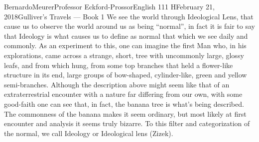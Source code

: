 \documentclass[12pt,letterpaper]{article}
\begin{document}
\begin{mla}{Bernardo}{Meurer}{Professor Eckford-Prossor}{English 111 H}{February 21, 2018}{Gulliver's Travels --- Book 1}
    We see the world through Ideological Lens, that cause us to observe the world around us as being ``normal'', in fact it is fair to say that Ideology is what causes us to define as normal that which we see daily and commonly. As an experiment to this, one can imagine the first Man who, in his explorations, came across a strange, short, tree with uncommonly large, glossy leafs, and from which hung, from some top branches that held a flower-like structure in its end, large groups of bow-shaped, cylinder-like, green and yellow semi-branches. Although the description above might seem like that of an extraterrestrial encounter with a nature far differing from our own, with some good-faith one can see that, in fact, the banana tree is what's being described. The commonness of the banana makes it seem ordinary, but most likely at first encounter and analysis it seems truly bizarre. To this filter and categorization of the normal, we call Ideology or Ideological lens (Zizek).
\end{mla}
\end{document}
